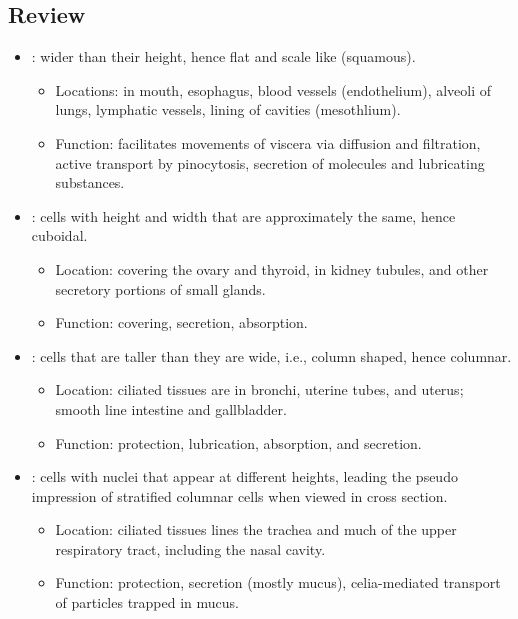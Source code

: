 \begin{itemize}
\begin{multicols}{2}
\begin{itemize}
  \end{itemize}
  \end{multicols}

  \subsection{Review}
  \begin{itemize}
    \item {}: wider than their height, hence flat and scale like (squamous). 
      \begin{itemize}
        \item Locations: in mouth, esophagus, blood vessels (endothelium), alveoli of lungs, lymphatic vessels, lining of cavities (mesothlium).
        \item Function: facilitates movements of viscera via diffusion and filtration, active transport by pinocytosis, secretion of molecules and lubricating substances. 
      \end{itemize}
    \item {}: cells with height and width that are approximately the same, hence cuboidal.
      \begin{itemize}
        \item Location: covering the ovary and thyroid, in kidney tubules, and other secretory portions of small glands.
        \item Function: covering, secretion, absorption.
      \end{itemize}
    \item {}: cells that are taller than they are wide, i.e., column shaped, hence columnar.
      \begin{itemize}
        \item Location: ciliated tissues are in bronchi, uterine tubes, and uterus; smooth line intestine and gallbladder.
        \item Function: protection, lubrication, absorption, and secretion.
      \end{itemize}
    \item {}: cells with nuclei that appear at different heights, leading the pseudo impression of stratified columnar cells when viewed in cross section.
      \begin{itemize}
        \item Location: ciliated tissues lines the trachea and much of the upper respiratory tract, including the nasal cavity.
        \item Function: protection, secretion (mostly mucus), celia-mediated transport of particles trapped in mucus.

\end{itemize}
\end{itemize}
\end{itemize}
